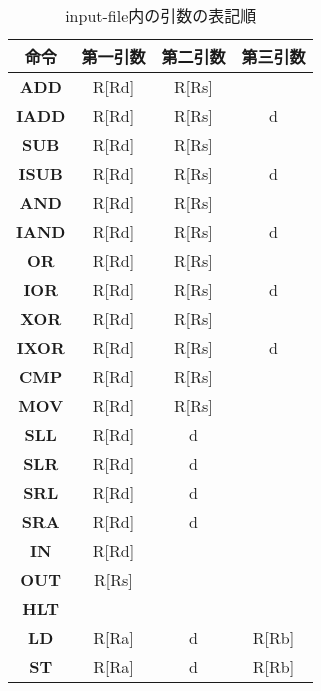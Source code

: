 \documentclass[a4paper,11pt,titlepage]{ltjsarticle}%
\begin{document}
\begin{table}[htbp]
\centering
\caption{input-file内の引数の表記順}
\begin{tabular}{|c|c|c|c|}
\hline
\textbf{命令}  & \textbf{第一引数} & \textbf{第二引数} & \textbf{第三引数} \\ \hline
\textbf{ADD}  & R{[}Rd{]}     & R{[}Rs{]}     &               \\ \hline
\textbf{IADD} & R{[}Rd{]}     & R{[}Rs{]}     & d             \\ \hline
\textbf{SUB}  & R{[}Rd{]}     & R{[}Rs{]}     &               \\ \hline
\textbf{ISUB} & R{[}Rd{]}     & R{[}Rs{]}     & d             \\ \hline
\textbf{AND}  & R{[}Rd{]}     & R{[}Rs{]}     &               \\ \hline
\textbf{IAND} & R{[}Rd{]}     & R{[}Rs{]}     & d             \\ \hline
\textbf{OR}   & R{[}Rd{]}     & R{[}Rs{]}     &               \\ \hline
\textbf{IOR}  & R{[}Rd{]}     & R{[}Rs{]}     & d             \\ \hline
\textbf{XOR}  & R{[}Rd{]}     & R{[}Rs{]}     &               \\ \hline
\textbf{IXOR} & R{[}Rd{]}     & R{[}Rs{]}     & d             \\ \hline
\textbf{CMP}  & R{[}Rd{]}     & R{[}Rs{]}     &               \\ \hline
\textbf{MOV}  & R{[}Rd{]}     & R{[}Rs{]}     &               \\ \hline
\textbf{SLL}  & R{[}Rd{]}     & d             &               \\ \hline
\textbf{SLR}  & R{[}Rd{]}     & d             &               \\ \hline
\textbf{SRL}  & R{[}Rd{]}     & d             &               \\ \hline
\textbf{SRA}  & R{[}Rd{]}     & d             &               \\ \hline
\textbf{IN}   & R{[}Rd{]}     &               &               \\ \hline
\textbf{OUT}  & R{[}Rs{]}     &               &               \\ \hline
\textbf{HLT}  &            &               &               \\ \hline
\textbf{LD}   & R{[}Ra{]}     & d             & R{[}Rb{]}     \\ \hline
\textbf{ST}   & R{[}Ra{]}     & d             & R{[}Rb{]}     \\ \hline

\end{tabular}
\end{table}
\end{document}
